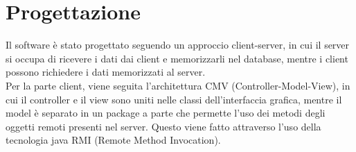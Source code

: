 \section{Progettazione}

Il software è stato progettato seguendo un approccio client-server, in cui il server si occupa di ricevere i dati dai client e memorizzarli nel database, mentre i client possono richiedere i dati memorizzati al server.\\
Per la parte client, viene seguita l'architettura CMV (Controller-Model-View), in cui il controller e il view sono uniti nelle classi dell'interfaccia grafica, mentre il model è separato in un package a parte che 
permette l'uso dei metodi degli oggetti remoti presenti nel server. Questo viene fatto attraverso l'uso della tecnologia java RMI (Remote Method Invocation).